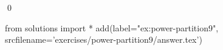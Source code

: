
\begin{ex} 
  \label{ex:power-partition9}
  
  \qed
\end{ex} 
\begin{python0}
from solutions import *
add(label="ex:power-partition9",
    srcfilename='exercises/power-partition9/answer.tex') 
\end{python0}
